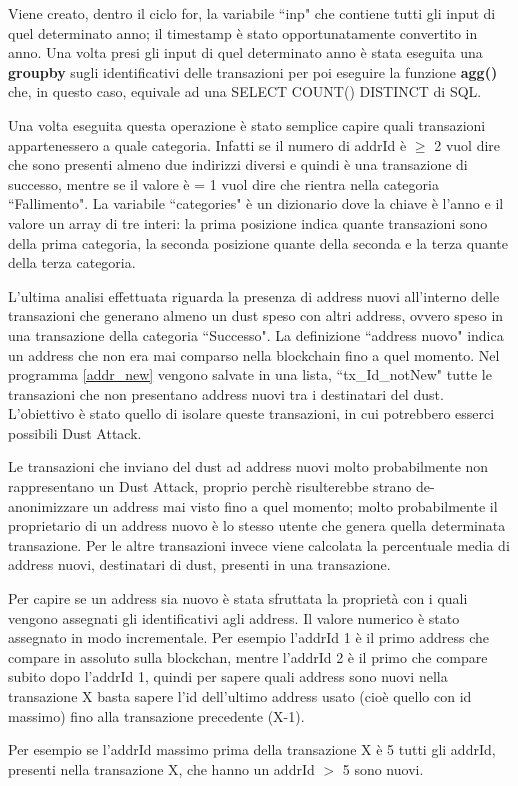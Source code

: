 Viene creato, dentro il ciclo for, la variabile ``inp" che contiene tutti gli input di quel determinato anno; il timestamp è stato opportunatamente convertito in anno. Una volta presi gli input di quel determinato anno è stata eseguita una \textbf{groupby} sugli identificativi delle transazioni per poi eseguire la funzione \textbf{agg({})} che, in questo caso, equivale ad una SELECT COUNT() DISTINCT di SQL.

Una volta eseguita questa operazione è stato semplice capire quali transazioni appartenessero a quale categoria. Infatti se il numero di addrId è $\ge$ 2 vuol dire che sono presenti almeno due indirizzi diversi e quindi è una transazione di successo, mentre se il valore è = 1 vuol dire che rientra nella categoria ``Fallimento". 
La variabile ``categories" è un dizionario dove la chiave è l'anno e il valore un array di tre interi: la prima posizione indica quante transazioni sono della prima categoria, la seconda posizione quante della seconda e la terza quante della terza categoria. 


L'ultima analisi effettuata riguarda la presenza di address nuovi all'interno delle transazioni che generano almeno un dust speso con altri address, ovvero speso in una transazione della categoria ``Successo". La definizione ``address nuovo" indica un address che non era mai comparso nella blockchain fino a quel momento. 
Nel programma \ref{addr_new} vengono salvate in una lista, ``tx\_Id\_notNew" tutte le transazioni che non presentano address nuovi tra i destinatari del dust. L'obiettivo è stato quello di isolare queste transazioni, in cui potrebbero esserci possibili Dust Attack.

Le transazioni che inviano del dust ad address nuovi  molto probabilmente non rappresentano un Dust Attack, proprio perchè risulterebbe strano de-anonimizzare un address mai visto fino a quel momento; molto probabilmente il proprietario di un address nuovo è lo stesso utente che genera quella determinata transazione. Per le altre transazioni invece viene calcolata la percentuale media di address nuovi, destinatari di dust, presenti in una transazione. 

Per capire se un address sia nuovo è stata sfruttata la proprietà con i quali vengono assegnati gli identificativi agli address. Il valore numerico è stato assegnato in modo incrementale. Per esempio l’addrId 1 è il primo address che compare in assoluto sulla blockchan, mentre l’addrId 2 è il primo che compare subito dopo l’addrId 1, quindi per sapere quali address sono nuovi nella transazione X basta sapere l'id dell'ultimo address usato (cioè quello con id massimo) fino alla transazione precedente (X-1). 

Per esempio se l'addrId massimo prima della transazione X è 5 tutti gli addrId, presenti nella transazione X, che hanno un addrId $>$ 5 sono nuovi.


